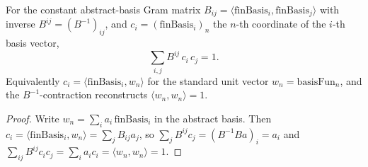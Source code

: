 \begin{lemma}[inverse-Gram/coordinate identity $\sum_{ij}B^{ij}c_ic_j=1$]
  \label{lem:dc-ch8-3-inverse-gram-coord}


  For the constant abstract-basis Gram matrix
  $B_{ij}=\langle\text{finBasis}_i,\text{finBasis}_j\rangle$ with inverse
  $B^{ij}=(B^{-1})_{ij}$, and $c_i=(\text{finBasis}_i)_n$ the $n$-th coordinate of
  the $i$-th basis vector,
  $$\sum_{i,j} B^{ij}\,c_i\,c_j = 1.$$
  Equivalently $c_i=\langle\text{finBasis}_i, w_n\rangle$ for the standard unit
  vector $w_n=\text{basisFun}_n$, and the $B^{-1}$-contraction reconstructs
  $\langle w_n, w_n\rangle=1$.
\end{lemma}
\begin{proof}

\sketch
  Write $w_n=\sum_i a_i\,\text{finBasis}_i$ in the abstract basis. Then
  $c_i=\langle\text{finBasis}_i,w_n\rangle=\sum_j
  B_{ij}a_j$, so $\sum_j B^{ij}c_j=(B^{-1}B a)_i=a_i$ and
  $\sum_{ij}B^{ij}c_ic_j=\sum_i a_i c_i=\langle w_n,w_n\rangle=1$.
\end{proof}

